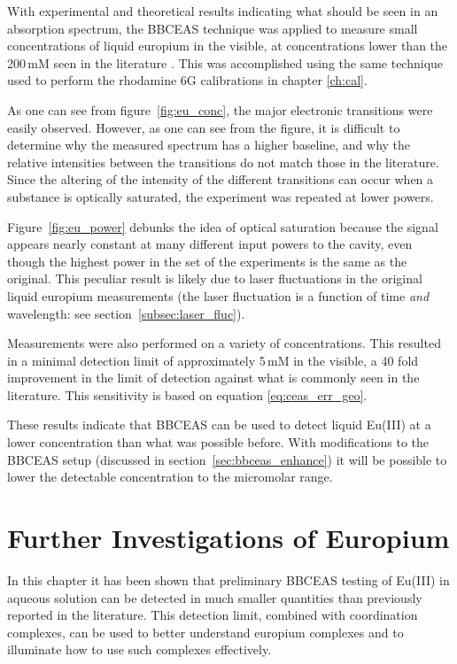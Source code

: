 With experimental and theoretical results indicating what should be seen in an
absorption spectrum, the \ac{BBCEAS} technique was applied to measure small
concentrations of liquid europium in the visible, at concentrations lower than
the 200\,mM seen in the literature \cite{Sawada:1979vca}. This was accomplished
using the same technique used to perform the rhodamine 6G calibrations in chapter \ref{ch:cal}.

As one can see from figure~\ref{fig:eu_conc}, the major electronic transitions
were easily observed. However, as one can see from the figure, it is difficult
to determine why the measured spectrum has a higher baseline, and why the
relative intensities between the transitions do not match those in the
literature. Since the altering of the intensity of the different transitions
can occur when a substance is optically saturated, the experiment was repeated
at lower powers.

Figure~\ref{fig:eu_power} debunks the idea of optical saturation because the
signal appears nearly constant at many different input powers to the cavity,
even though the highest power in the set of the experiments is the same as the
original. This peculiar result is likely due to laser fluctuations in the
original liquid europium measurements (the laser fluctuation is a function of
time \emph{and} wavelength: see section~\ref{subsec:laser_fluc}).

Measurements were also performed on a variety of concentrations. This resulted
in a minimal detection limit of approximately 5\,mM in the visible, a 40 fold
improvement in the limit of detection against what is commonly seen in the
literature. This sensitivity is based on equation \eqref{eq:ceas_err_geo}.

These results indicate that \ac{BBCEAS} can be used to detect liquid Eu(III) at
a lower concentration than what was possible before. With modifications to the
\ac{BBCEAS} setup (discussed in section~\ref{sec:bbceas_enhance}) it will be
possible to lower the detectable concentration to the micromolar range.



\section{Further Investigations of Europium}\label{sec:eu_future}

In this chapter it has been shown that preliminary \ac{BBCEAS} testing of
Eu(III) in aqueous solution can be detected in much smaller quantities than
previously reported in the literature.  This detection limit, combined with
coordination complexes, can be used to better understand europium complexes and
to illuminate how to use such complexes effectively.



